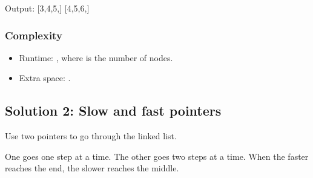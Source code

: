 \documentclass[letterpaper,12pt,english]{book}
\begin{document}
\begin{sphinxVerbatim}[commandchars=\\\{\}]
Output:
[3,4,5,]
[4,5,6,]
\end{sphinxVerbatim}


\subsubsection{Complexity}
\label{\detokenize{Two_Pointers/08_TP_876_Middle_of_the_Linked_List:complexity}}\begin{itemize}
\item {} 
\sphinxAtStartPar
Runtime: , where  is the number of nodes.

\item {} 
\sphinxAtStartPar
Extra space: .

\end{itemize}


\subsection{Solution 2: Slow and fast pointers}
\label{\detokenize{Two_Pointers/08_TP_876_Middle_of_the_Linked_List:solution-2-slow-and-fast-pointers}}
\sphinxAtStartPar
Use two pointers to go through the linked list.

\sphinxAtStartPar
One goes one step at a time. The other goes two steps at a time. When the faster reaches the end, the slower reaches the middle.
\end{document}
